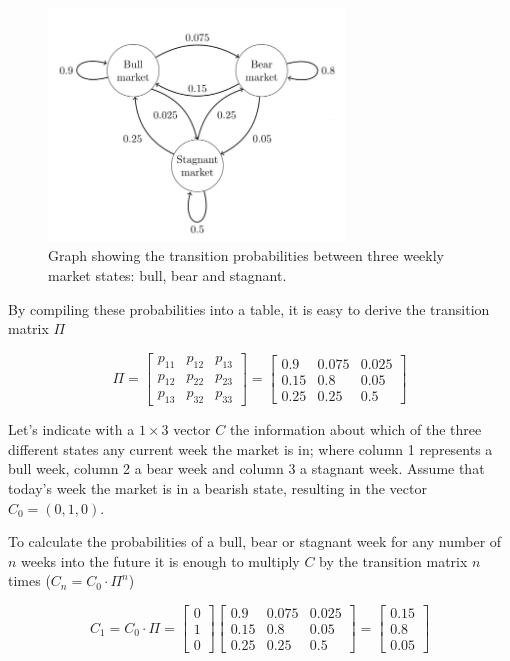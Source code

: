 \begin{figure}[htb]
	\centering
	\includegraphics[width=0.7\textwidth]{figures/markov_chain}
	\caption{Graph showing the transition probabilities between three weekly market states: bull, bear and stagnant.}
	\label{fig:markov_chain}
\end{figure}

By compiling these probabilities into a table, it is easy to derive the transition matrix $\Pi$

\[\Pi = 
\begin{bmatrix}
p_{11} & p_{12} & p_{13} \\
p_{12} & p_{22} & p_{23} \\
p_{13} & p_{32} & p_{33}
\end{bmatrix} =
\begin{bmatrix}
0.9 & 0.075 & 0.025 \\
0.15 & 0.8 & 0.05 \\
0.25 & 0.25 & 0.5
\end{bmatrix} 
\]

Let's indicate with a $1 \times 3$ vector $C$ the information about which of the three different states any current week the market is in; where column 1 represents a bull week, column 2 a bear week and column 3 a stagnant week. Assume that today's week the market is in a bearish state, resulting in the vector $C_0  = (0, 1, 0)$.

To calculate the probabilities of a bull, bear or stagnant week for any number of $n$ weeks into the future it is enough to multiply $C$ by the transition matrix $n$ times ($C_n = C_0\cdot \Pi^n$)

\[C_1 = C_0 \cdot \Pi =  
\begin{bmatrix}
0 \\
1 \\
0 
\end{bmatrix}
\begin{bmatrix}
0.9 & 0.075 & 0.025 \\
0.15 & 0.8 & 0.05 \\
0.25 & 0.25 & 0.5
\end{bmatrix} = 
\begin{bmatrix}
0.15 \\
0.8 \\
0.05 
\end{bmatrix}
\]

